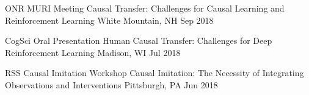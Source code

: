 


\begin{cventries}


\cventry
{ONR MURI Meeting} %
{Causal Transfer: Challenges for Causal Learning and Reinforcement Learning} %
{White Mountain, NH} %
{Sep 2018} %
{ %
}
\vspace{-4mm}


\cventry
{CogSci Oral Presentation} %
{Human Causal Transfer: Challenges for Deep Reinforcement Learning} %
{Madison, WI} %
{Jul 2018} %
{ %
}
\vspace{-4mm}


\cventry
{RSS Causal Imitation Workshop} %
{Causal Imitation: The Necessity of Integrating Observations and Interventions} %
{Pittsburgh, PA} %
{Jun 2018} %
{ %
}
\vspace{-4mm}



\end{cventries}
